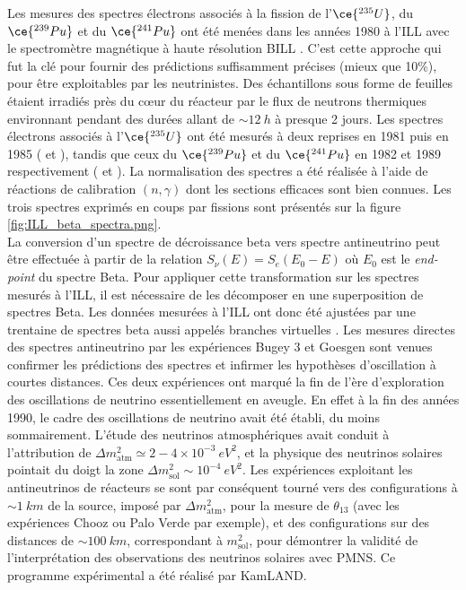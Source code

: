 Les mesures des spectres électrons associés à la fission de l'$\ce{^{235}U}$, du $\ce{^{239}Pu}$ et du $\ce{^{241}Pu}$ ont été menées dans les années 1980 à l'ILL avec le spectromètre magnétique à haute résolution BILL \cite{Schreckenbach:WorkshoponBeyondThreeFamilyNeutrinoOscillations}. C'est cette approche qui fut la clé pour fournir des prédictions suffisamment précises (mieux que 10\%), pour être exploitables par les neutrinistes. Des échantillons sous forme de feuilles étaient irradiés près du c\oe ur du réacteur par le flux de neutrons thermiques environnant pendant des durées allant de $\sim 12\SI{}{h}$ à presque 2 jours. Les spectres électrons associés à l'$\ce{^{235}U}$ ont été mesurés à deux reprises en 1981 puis en 1985 (\cite{Schreckenbach:1981wlm} et \cite{Schreckenbach:1985ep}), tandis que ceux du $\ce{^{239}Pu}$ et du $\ce{^{241}Pu}$ en 1982 et 1989 respectivement (\cite{VonFeilitzsch:1982jw} et \cite{Hahn:1989zr}). La normalisation des spectres a été réalisée à l'aide de réactions de calibration $(n,\gamma)$ dont les sections efficaces sont bien connues. Les trois spectres exprimés en coups par fissions sont présentés sur la figure \ref{fig:ILL_beta_spectra.png}.\\

La conversion d'un spectre de décroissance beta vers spectre antineutrino peut être effectuée à partir de la relation $S_\nu(E) = S_e(E_0 - E)$ où $E_0$ est le \textit{end-point} du spectre Beta. Pour appliquer cette transformation sur les spectres mesurés à l'ILL, il est nécessaire de les décomposer en une superposition de spectres Beta. Les données mesurées à l'ILL ont donc été ajustées par une trentaine de spectres beta aussi appelés \og branches virtuelles \fg{} \cite{Vogel:2007du}. Les mesures directes des spectres antineutrino par les expériences Bugey 3 \cite{Achkar:1996rd} et Goesgen \cite{Zacek:1986cu} sont venues confirmer les prédictions des spectres et infirmer les hypothèses d'oscillation à courtes distances. Ces deux expériences ont marqué la fin de l'ère d'exploration des oscillations de neutrino essentiellement en aveugle. En effet à la fin des années 1990, le cadre des oscillations de neutrino avait été établi, du moins sommairement. L'étude des neutrinos atmosphériques avait conduit à l'attribution de  $\Delta m^2_\textrm{atm} \simeq 2-4 \times 10^{-3} \SI{}{eV^2}$, et la physique des neutrinos solaires pointait du doigt la zone $\Delta m^2_\textrm{sol} \sim 10^{-4} \SI{}{eV^2}$. Les expériences exploitant les antineutrinos de réacteurs se sont par conséquent tourné vers des configurations à $\sim \SI{1}{km}$ de la source, imposé par $\Delta m^2_\textrm{atm}$, pour la mesure de $\theta_{13}$ (avec les expériences Chooz ou Palo Verde par exemple), et des configurations sur des distances de $\sim \SI{100}{km}$, correspondant à $m^2_\textrm{sol}$, pour démontrer la validité de l'interprétation des observations des neutrinos solaires avec PMNS. Ce programme expérimental a été réalisé par KamLAND.\\

